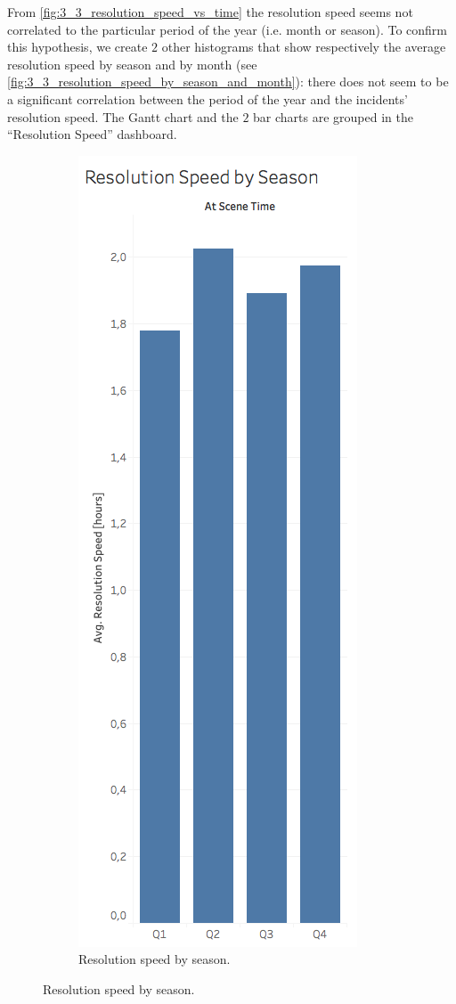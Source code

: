 From \cref{fig:3_3_resolution_speed_vs_time} the resolution speed seems not correlated to the particular period of the year (i.e. month or season).
To confirm this hypothesis, we create $2$ other histograms that show respectively the average resolution speed by season and by month (see \cref{fig:3_3_resolution_speed_by_season_and_month}):
there does not seem to be a significant correlation between the period of the year and the incidents' resolution speed.
The Gantt chart and the $2$ bar charts are grouped in the ``Resolution Speed'' dashboard.

\begin{figure}[h!]
    \begin{subfigure}{0.4\textwidth}
        \centering
        \includegraphics[width=0.5\linewidth]{figures/3_3_resolution_speed_by_season} 
        \caption{Resolution speed by season.}
        \label{fig:3_3_resolution_speed_by_season}

\end{subfigure}
\end{figure}
